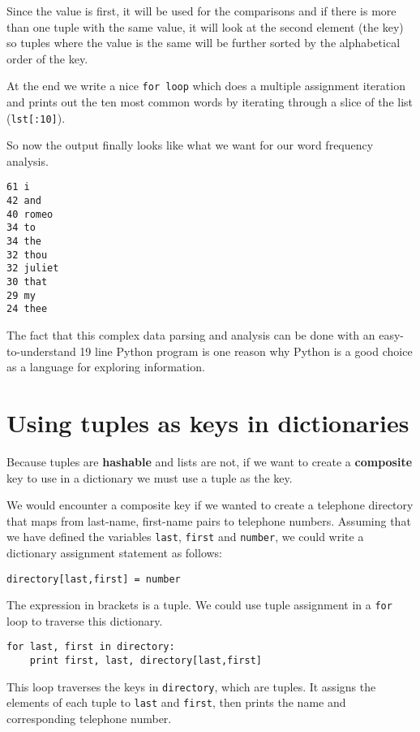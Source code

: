 Since the value is first, it will be used for the comparisons and 
if there is more than one tuple with the same value, it will look
at the second element (the key) so tuples where the value is the
same will be further sorted by the alphabetical order of the key.

At the end we write a nice {\tt for loop} which does a multiple
assignment iteration and prints out the ten most common words
by iterating through a slice of the list ({\tt lst[:10]}).

So now the output finally looks like what we want for our word 
frequency analysis.

\beforeverb
\begin{verbatim}
61 i
42 and
40 romeo
34 to
34 the
32 thou
32 juliet
30 that
29 my
24 thee
\end{verbatim}
\afterverb
%
The fact that this complex data parsing and analysis 
can be done with an easy-to-understand 19 line Python
program is one reason why Python is a good choice as a language 
for exploring information.

\section{Using tuples as keys in dictionaries}


Because tuples are {\bf hashable} and lists are not, if we want to 
create a {\bf composite} key to use in a dictionary we must use a tuple as
the key.

We would encounter a composite key if we wanted to create a 
telephone directory that maps
from last-name, first-name pairs to telephone numbers.  Assuming
that we have defined the variables 
{\tt last}, {\tt first} and {\tt number}, we could write
a dictionary assignment statement as follows:

\beforeverb
\begin{verbatim}
directory[last,first] = number
\end{verbatim}
\afterverb
%
The expression in brackets is a tuple.  We could use tuple
assignment in a {\tt for} loop to traverse this dictionary.


\beforeverb
\begin{verbatim}
for last, first in directory:
    print first, last, directory[last,first]
\end{verbatim}
\afterverb
%
This loop traverses the keys in {\tt directory}, which are tuples.  It
assigns the elements of each tuple to {\tt last} and {\tt first}, then
prints the name and corresponding telephone number.

